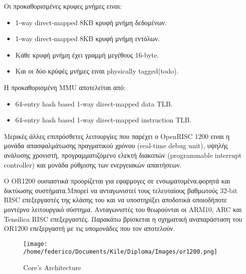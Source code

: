 \documentclass[a4paper,10pt]{article}
\begin{document}
{{Οι προκαθορισμένες κρυφες μνήμες ειναι:
\begin{itemize}
 \item 1-way direct-mapped 8KB κρυφή μνήμη δεδομένων.
 \item 1-way direct-mapped 8KB κρυφή μνήμη εντόλων.
 \item Κάθε κρυφή μνήμη έχει γραμμή μεγέθους 16-byte.
 \item Και οι δύο κρύφές μνήμες ειναι  physically tagged(todo).
\end{itemize}

Η προκαθορισμένη MMU αποτελείται από:
\begin{itemize}
 \item 64-entry hash based 1-way direct-mapped data TLB.
 \item 64-entry hash based 1-way direct-mapped instruction TLB.
\end{itemize}

Μερικές άλλες επιπρόσθετες λειτουργίες που παρέχει ο OpenRISC 1200 ειναι η μονάδα
απασφαλμάτωσης πραγματικού χρόνου (real-time debug unit), υψηλής ανάλυσης χρονιστή,
προγραμματιζόμενο ελεκτή διακοπών (programmable interrupt controller) και μονάδα
ρύθμισης των ενεργειακών απαιτήσεων.


Ο OR1200 ουσιαστικά προορίζεται για εφαρμογες σε ενσωματομένα,φορητά και δικτύωσης
συστήματα.Μπορεί να ανταγωνιστεί τους τελευταίους βαθμωτούς 32-bit RISC επεξεργαστές
της κλάσης του και να υποστηρίξει αποδοτικά οποιοδήποτε μοντέρνο λειτουργικό σύστημα.
Ανταγωνιστές του θεωρούνται οι ARM10, ARC και Tensilica RISC επεξεργαστές.
\newline \newline
Παρακάτω βρίσκεται η σχηματική αναπαράσταση του OR1200 επεξεργαστή με τις υπομονάδες
που τον αποτελούν.

\begin{figure}[h!]
 \centering
 \texttt{[image: /home/federico/Documents/Kile/Diploma/Images/or1200.png]}
 \caption{Core's Architecture}
\end{figure}

}}
\end{document}
